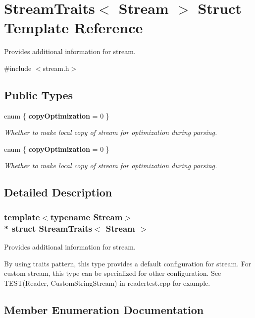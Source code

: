 \hypertarget{struct_stream_traits}{}\section{Stream\+Traits$<$ Stream $>$ Struct Template Reference}
\label{struct_stream_traits}


Provides additional information for stream.  




{\ttfamily \#include $<$stream.\+h$>$}

\subsection*{Public Types}
\begin{DoxyCompactItemize}
\item 
enum \{ {\bfseries copy\+Optimization} = 0
 \}\begin{DoxyCompactList}\small\item\em Whether to make local copy of stream for optimization during parsing. \end{DoxyCompactList}
\item 
enum \{ {\bfseries copy\+Optimization} = 0
 \}\begin{DoxyCompactList}\small\item\em Whether to make local copy of stream for optimization during parsing. \end{DoxyCompactList}
\end{DoxyCompactItemize}


\subsection{Detailed Description}
\subsubsection*{template$<$typename Stream$>$\\*
struct Stream\+Traits$<$ Stream $>$}

Provides additional information for stream. 

By using traits pattern, this type provides a default configuration for stream. For custom stream, this type can be specialized for other configuration. See T\+E\+S\+T(\+Reader, Custom\+String\+Stream) in readertest.\+cpp for example. 

\subsection{Member Enumeration Documentation}
